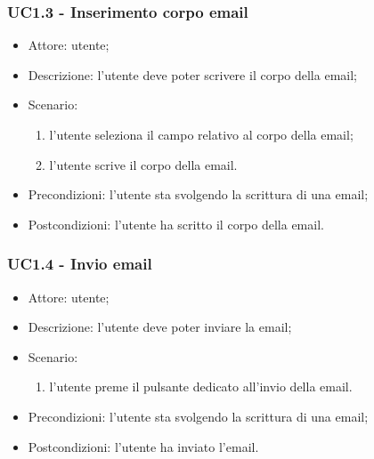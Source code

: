     \subsubsection{UC1.3 - Inserimento corpo email}
    \begin{itemize}
        \item Attore: utente;
        \item Descrizione: l'utente deve poter scrivere il corpo della email;
        \item Scenario:
        \begin{enumerate}
        \item l'utente seleziona il campo relativo al corpo della email;
        \item l'utente scrive il corpo della email.
        \end{enumerate}
        \item Precondizioni: l'utente sta svolgendo la scrittura di una email;
        \item Postcondizioni: l'utente ha scritto il corpo della email.
    \end{itemize}

    \subsubsection{UC1.4 - Invio email}
    \begin{itemize}
        \item Attore: utente;
        \item Descrizione: l'utente deve poter inviare la email;
        \item Scenario:
        \begin{enumerate}
        \item l'utente preme il pulsante dedicato all'invio della email.
        \end{enumerate}
        
        \item Precondizioni: l'utente sta svolgendo la scrittura di una email;
        \item Postcondizioni: l'utente ha inviato l'email.
    \end{itemize}

